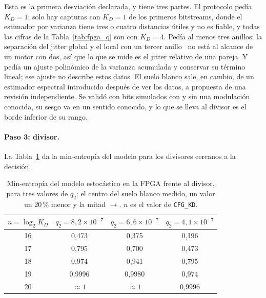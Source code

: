 Esta es la primera desviación declarada, y tiene tres partes. El
protocolo pedía $K_D = 1$; solo hay capturas con $K_D = 1$ de los
primeros bitstreams, donde el estimador por varianza tiene tres o cuatro
distancias útiles y no es fiable, y todas las cifras de la
Tabla~\ref{tab:fpga_q} son con $K_D = 4$. Pedía al menos tres anillos;
la separación del jitter global y el
local con un tercer anillo~\cite{lubicz_2024_jitter} no está al alcance
de un motor con dos, así que lo que se mide es el jitter relativo de una
pareja. Y pedía un ajuste
polinómico de la varianza acumulada y conservar su término lineal; ese
ajuste no describe estos datos. El suelo blanco sale, en cambio, de un estimador
espectral introducido después de ver los datos, a propuesta de una
revisión independiente. Se validó con bits simulados con y sin una
modulación conocida, su sesgo va en un sentido conocido, y lo que se
lleva al divisor es el borde inferior de su rango.

\paragraph{Paso 3: divisor.} La Tabla~\ref{tab:fpga_kd} da la
min-entropía del modelo para los divisores cercanos a la decisión.

\begin{table}[htbp]
\centering
\caption{Min-entropía del modelo estocástico en la \ac{FPGA} frente al
divisor, para tres valores de $q_2$: el centro del suelo blanco medido,
un valor un 20\,\% menor y la mitad \meas{}$\rightarrow$\est{}. $n$ es el
valor de \texttt{CFG\_KD}.}
\label{tab:fpga_kd}
\small
\begin{tabular}{@{}cccc@{}}
\toprule
$n = \log_2 K_D$ & $q_2 = 8{,}2\times10^{-7}$ & $q_2 = 6{,}6\times10^{-7}$ & $q_2 = 4{,}1\times10^{-7}$ \\
\midrule
16 & 0,473  & 0,375  & 0,196 \\
17 & 0,795  & 0,700  & 0,473 \\
18 & 0,974  & 0,941  & 0,795 \\
19 & 0,9996 & 0,9980 & 0,974 \\
20 & $\approx 1$ & $\approx 1$ & 0,9996 \\
\bottomrule
\end{tabular}
\end{table}

